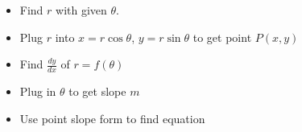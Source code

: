 \documentclass{report}
\begin{document}
\begin{itemize}
            \begin{itemize}
                \item Find $r$ with given $\theta$.
                \item Plug $r$ into $x=r\cos{\theta }$, $y=r\sin{\theta }$ to get point $P(x,y)$
                \item Find $\frac{dy}{dx}$ of $r=f(\theta)$
                \item Plug in $\theta$ to get slope $m$
                \item Use point slope form to find equation
            \end{itemize}






    \end{itemize}

    \pagebreak 
\end{document}
